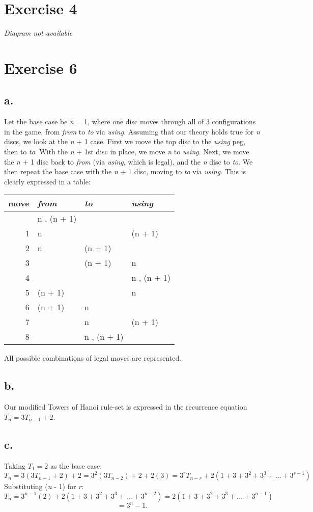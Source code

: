 \documentclass[12pt]{article}
\begin{document}
\section*{Exercise 4}
\emph{Diagram not available}

\section*{Exercise 6}
\subsection*{a.}
Let the base case be \emph{n} = 1, where one disc moves through
all of 3 configurations in the game, from \emph{from} to \emph{to}
via \emph{using}.  Assuming that our theory holds true for
\emph{n} discs, we look at the \emph{n} + 1 case.  First we move
the top disc to the \emph{using} peg, then to \emph{to}.  With the
\emph{n} + 1st disc in place, we move \emph{n} to \emph{using}.
Next, we move the \emph{n} + 1 disc back to \emph{from} (via
\emph{using}, which is legal), and the \emph{n} disc to \emph{to}.
We then repeat the base case with the \emph{n} + 1 disc, moving to
\emph{to} via \emph{using}. This is clearly expressed in a table:

\begin{center}
\begin{tabular}{r|l|l|l}
move & \emph{from} & \emph{to} & \emph{using} \\
\hline
  & n , (n + 1) &\\
1 & n & & (n + 1) \\
2 & n & (n + 1) \\
3 & & (n + 1) & n \\
4 & & & n , (n + 1) \\
5 & (n + 1) & & n \\
6 & (n + 1) & n \\
7 & & n & (n + 1)\\
8 & & n , (n + 1) \\
\end{tabular}
\end{center}

All possible combinations of legal moves are represented.
\subsection*{b.}
Our modified Towers of Hanoi rule-set is expressed in the
recurrence equation $ T_n = 3T_{n - 1} + 2 $.
\subsection*{c.}
Taking $T_1 = 2$ as the base case:
$$
T_n = 3(3T_{n - 1} + 2) + 2 = 3^2(3T_{n - 2}) + 2 + 2(3) = 3^{r}T_{n - r} + 2(1 + 3 + 3^2 + 3^3 +
\ldots + 3^{r - 1})
$$
Substituting (\emph{n} - 1) for \emph{r}:
$$
T_n = 3^{n - 1}(2) + 2(1 + 3 + 3^2+3^3 + \ldots + 3^{n-2}) = 2(1 + 3 + 3^2+3^3 + \ldots + 3^{n-1})
$$
$$ = 3^n - 1. $$
\end{document}
